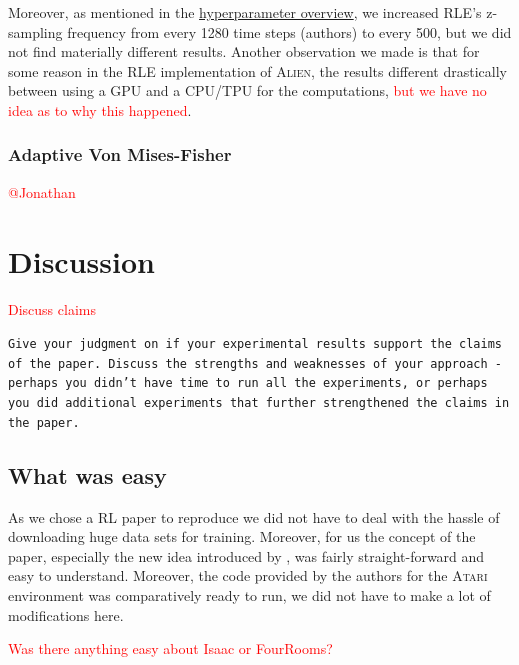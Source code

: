 \documentclass[10pt]{article} %
\begin{document}
\noindent Moreover, as mentioned in the \hyperlink{hyperparameter-subsection}{hyperparameter overview}, we increased RLE's z-sampling frequency from every 1280 time steps (authors) to every 500, but we did not find materially different results. Another observation we made is that for some reason in the RLE implementation of \textsc{Alien}, the results different drastically between using a GPU and a CPU/TPU for the computations, \textcolor{red}{but we have no idea as to why this happened}.

\subsubsection{Adaptive Von Mises-Fisher}
\textcolor{red}{@Jonathan}


\section{Discussion}
\textcolor{red}{Discuss claims}


\texttt{Give your judgment on if your experimental results support the claims of the paper. Discuss the strengths and weaknesses of your approach - perhaps you didn't have time to run all the experiments, or perhaps you did additional experiments that further strengthened the claims in the paper.}

\subsection{What was easy}

\noindent As we chose a RL paper to reproduce we did not have to deal with the hassle of downloading huge data sets for training. Moreover, for us the concept of the paper, especially the new idea introduced by \cite{rle-paper}, was fairly straight-forward and easy to understand. Moreover, the code provided by the authors for the \textsc{Atari} environment was comparatively ready to run, we did not have to make a lot of modifications here.

\textcolor{red}{Was there anything easy about Isaac or FourRooms?}
\end{document}
